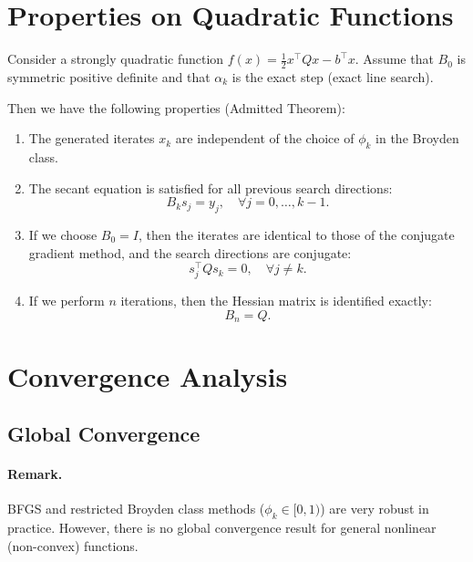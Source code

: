 \section{Properties on Quadratic Functions}

Consider a strongly quadratic function $f(x) = \frac{1}{2} x^\top Q x - b^\top x$.
Assume that $B_0$ is symmetric positive definite and that $\alpha_k$ is the exact step (exact line search).

Then we have the following properties (Admitted Theorem):
\begin{enumerate}
    \item The generated iterates $x_k$ are independent of the choice of $\phi_k$ in the Broyden class.
    \item The secant equation is satisfied for all previous search directions:
    \begin{equation}
        B_k s_j = y_j, \quad \forall j = 0, \dots, k-1.
    \end{equation}
    \item If we choose $B_0 = I$, then the iterates are identical to those of the conjugate gradient method, and the search directions are conjugate:
    \begin{equation}
        s_j^\top Q s_k = 0, \quad \forall j \neq k.
    \end{equation}
    \item If we perform $n$ iterations, then the Hessian matrix is identified exactly:
    \begin{equation}
        B_n = Q.
    \end{equation}
\end{enumerate}

\section{Convergence Analysis}

\subsection{Global Convergence}

\paragraph{Remark.}
BFGS and restricted Broyden class methods ($\phi_k \in [0, 1)$) are very robust in practice.
However, there is no global convergence result for general nonlinear (non-convex) functions.


